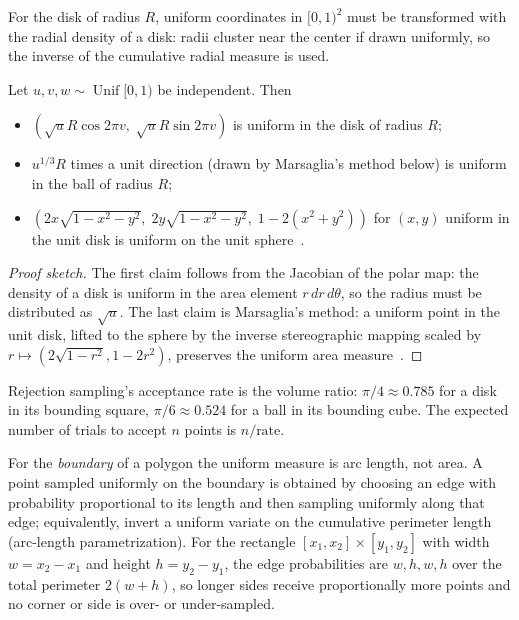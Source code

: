 For the disk of radius $R$, uniform coordinates in $[0, 1)^2$ must be
transformed with the radial density of a disk: radii cluster near the center
if drawn uniformly, so the inverse of the cumulative radial measure is used.

\begin{theorem}\label{thm:uniform_ball}
Let $u, v, w \sim \operatorname{Unif}[0, 1)$ be independent. Then
\begin{itemize}
\item $(\sqrt{u} R \cos 2\pi v, \; \sqrt{u} R \sin 2\pi v)$ is uniform in the
  disk of radius $R$;
\item $u^{1/3} R$ times a unit direction (drawn by Marsaglia's method below)
  is uniform in the ball of radius $R$;
\item $(2x\sqrt{1 - x^2 - y^2}, \; 2y\sqrt{1 - x^2 - y^2}, \; 1 - 2(x^2 + y^2))$
  for $(x, y)$ uniform in the unit disk is uniform on the unit
  sphere~\cite{marsaglia1972}.
\end{itemize}
\end{theorem}
\begin{proof}[Proof sketch]
The first claim follows from the Jacobian of the polar map: the density of a
disk is uniform in the area element $r\,dr\,d\theta$, so the radius must be
distributed as $\sqrt{u}$. The last claim is Marsaglia's method: a uniform
point in the unit disk, lifted to the sphere by the inverse stereographic
mapping scaled by $r \mapsto (2\sqrt{1-r^2}, 1 - 2r^2)$, preserves the uniform
area measure~\cite{marsaglia1972}.
\end{proof}

Rejection sampling's acceptance rate is the volume ratio: $\pi/4 \approx 0.785$
for a disk in its bounding square, $\pi/6 \approx 0.524$ for a ball in its
bounding cube. The expected number of trials to accept $n$ points is
$n / \text{rate}$.

For the \emph{boundary} of a polygon the uniform measure is arc length, not
area. A point sampled uniformly on the boundary is obtained by choosing an
edge with probability proportional to its length and then sampling uniformly
along that edge; equivalently, invert a uniform variate on the cumulative
perimeter length (arc-length parametrization). For the rectangle
$[x_1, x_2] \times [y_1, y_2]$ with width $w = x_2 - x_1$ and height
$h = y_2 - y_1$, the edge probabilities are
$w, h, w, h$ over the total perimeter $2(w + h)$, so longer sides receive
proportionally more points and no corner or side is over- or
under-sampled.

